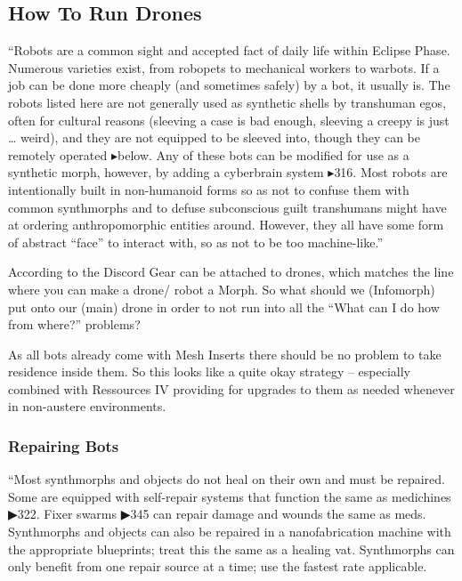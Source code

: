 
\subsection{How To Run Drones}

“Robots are a common sight and accepted fact of daily life within Eclipse Phase. Numerous varieties exist, from robopets to mechanical workers to warbots. If a job can be done more cheaply (and sometimes safely) by a bot, it usually is. The robots listed here are not generally used as synthetic shells by transhuman egos, often for cultural reasons (sleeving a case is bad enough, sleeving a creepy is just … weird), and they are not equipped to be sleeved into, though they can be remotely operated $\blacktriangleright$below. Any of these bots can be modified for use as a synthetic morph, however, by adding a cyberbrain system $\blacktriangleright$316. Most robots are intentionally built in non-humanoid forms so as not to confuse them with common synthmorphs and to defuse subconscious guilt transhumans might have at ordering anthropomorphic entities around. However, they all have some form of abstract “face” to interact with, so as not to be too machine-like.” \citep[pg. 346]{ep2e_1.1_2019}

According to the Discord Gear can be attached to drones, which matches the line where you can make a drone/ robot a Morph. So what should we (Infomorph) put onto our (main) drone in order to not run into all the “What can I do how from where?” problems?

As all bots already come with Mesh Inserts there should be no problem to take residence inside them. So this looks like a quite okay strategy -- especially combined with Ressources IV providing for upgrades to them as needed whenever in non-austere environments.

\subsubsection{Repairing Bots}

“Most synthmorphs and objects do not heal on their own and must be repaired. Some are equipped with self-repair systems that function the same as medichines ▶322. Fixer swarms ▶345 can repair damage and wounds the same as meds. Synthmorphs and objects can also be repaired in a nanofabrication machine with the appropriate blueprints; treat this the same as a healing vat. Synthmorphs can only benefit from one repair source at a time; use the fastest rate applicable.

